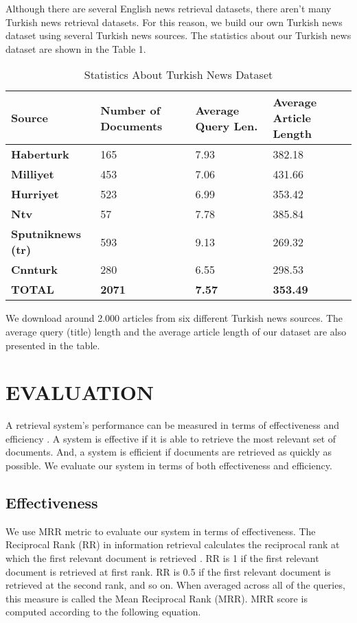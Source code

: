 \documentclass[conference]{IEEEtran}
\begin{document}
Although there are several English news retrieval datasets, there aren't many Turkish news retrieval datasets. For this reason, we build our own Turkish news dataset using several Turkish news sources. The statistics about our Turkish news dataset are shown in the Table 1.

\begin{table}[htbp]
\caption{Statistics About Turkish News Dataset}
\begin{center}
\begin{tabular}{|p{22mm}|p{15mm}|p{15mm}|p{19mm}|}
\hline
\textbf{Source} & \textbf{Number of Documents}& \textbf{Average Query Len.}& \textbf{Average Article Length} \\
\hline
\textbf{Haberturk} & 165 & 7.93 & 382.18 \\
\textbf{Milliyet} & 453 & 7.06 & 431.66 \\
\textbf{Hurriyet} & 523 & 6.99 & 353.42 \\
\textbf{Ntv} & 57 & 7.78 & 385.84 \\
\textbf{Sputniknews (tr)} & 593 & 9.13 & 269.32 \\
\textbf{Cnnturk} & 280 & 6.55 & 298.53 \\
\textbf{TOTAL} & \textbf{2071} & \textbf{7.57} & \textbf{353.49} \\
\hline
\end{tabular}
\label{tab1}
\end{center}
\end{table}

We download around 2.000 articles from six different Turkish news sources. The average query (title) length and the average article length of our dataset are also presented in the table.

\section{EVALUATION}
A retrieval system's performance can be measured in terms of effectiveness and efficiency \cite{irbook}. A system is effective if it is able to retrieve the most relevant set of documents. And, a system is efficient if documents are retrieved as quickly as possible. We evaluate our system in terms of both effectiveness and efficiency.

\subsection{Effectiveness}

We use MRR metric to evaluate our system in terms of effectiveness. The Reciprocal Rank (RR) in information retrieval calculates the reciprocal rank at which the first relevant document is retrieved \cite{mrr}. RR is 1 if the first relevant document is retrieved at first rank. RR is 0.5 if the first relevant document is retrieved at the second rank, and so on. When averaged across all of the queries, this measure is called the Mean Reciprocal Rank (MRR). MRR score is computed according to the following equation.
\end{document}
